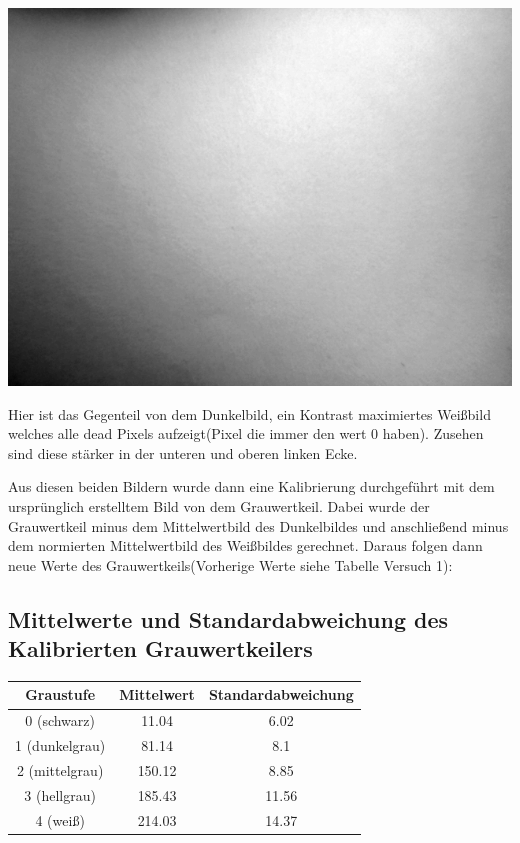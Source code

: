 \includegraphics[scale=0.6]{media/weissContrastMax}

Hier ist das Gegenteil von dem Dunkelbild, ein Kontrast maximiertes Weißbild welches alle dead Pixels aufzeigt(Pixel die immer den wert 0 haben). Zusehen sind diese stärker in der unteren und oberen linken Ecke.

Aus diesen beiden Bildern wurde dann eine Kalibrierung durchgeführt mit dem ursprünglich erstelltem Bild von dem Grauwertkeil. Dabei wurde der Grauwertkeil minus dem Mittelwertbild des Dunkelbildes und anschließend minus dem normierten Mittelwertbild des Weißbildes gerechnet. Daraus folgen dann neue Werte des Grauwertkeils(Vorherige Werte siehe Tabelle Versuch 1):

\subsection*{Mittelwerte und Standardabweichung des Kalibrierten Grauwertkeilers}

\begin{tabular}{|c|c|c|}
\hline 
Graustufe & Mittelwert & Standardabweichung \\ 
\hline 
0 (schwarz) & 11.04 & 6.02 \\
\hline 
1 (dunkelgrau) & 81.14 & 8.1 \\ 
\hline 
2 (mittelgrau) & 150.12 & 8.85 \\ 
\hline 
3 (hellgrau) & 185.43 & 11.56 \\ 
\hline 
4 (weiß) & 214.03 & 14.37 \\ 
\hline 
\end{tabular} 
\newpage


